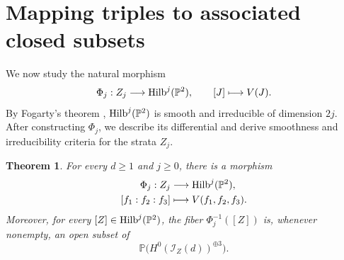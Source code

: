 \documentclass[11pt]{amsart} %
\newtheorem{Theorem}{Theorem}[section]
\theoremstyle{definition}
\def\NZQ{\mathbb}               %
\def\PP{{\NZQ P}}
\def\Hilbert{{\rm Hilb}}
\begin{document}
\section{Mapping triples to associated closed subsets}\label{sec:hilbert-map}

We now study the natural morphism
\[
\Phi_j:Z_j\longrightarrow\Hilbert^j(\PP^2),
\qquad
[J]\longmapsto V(J).
\]
By Fogarty's theorem
\cite[Proposition~2.3 and Theorem~2.4]{Fogarty1968},
$\Hilbert^j(\PP^2)$ is smooth and irreducible of dimension $2j$.
After constructing $\Phi_j$, we describe its differential and derive
smoothness and irreducibility criteria for the strata $Z_j$.

\begin{Theorem}\label{thm:hilb-map-j}
For every $d\geq1$ and $j\geq0$, there is a morphism
\[
\begin{aligned}
\Phi_j:Z_j&\longrightarrow\Hilbert^j(\PP^2),\\
[f_1:f_2:f_3]
&\longmapsto
V(f_1,f_2,f_3).
\end{aligned}
\]
Moreover, for every $[Z]\in\Hilbert^j(\PP^2)$, the fiber
$\Phi_j^{-1}([Z])$ is, whenever nonempty, an open subset of
\[
\PP\bigl(H^0(\mathcal I_Z(d))^{\oplus3}\bigr).
\]
\end{Theorem}
\end{document}

